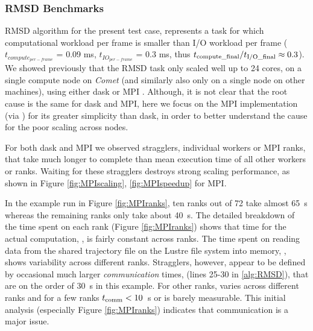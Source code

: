 \label{impl_exp}

\subsubsection{RMSD Benchmarks}
\label{sec:RMSD}
RMSD algorithm for the present test case, represents a task for which computational workload per frame is smaller than I/O workload per frame ($t_{compute_{per-frame}}$ = 0.09 ms, $t_{IO_{per-frame}}$ = 0.3 ms, thus ${t}_{\text{compute\_final}}/{t}_{\text{I/O\_final}} \approx 0.3$). 
We showed previously that the RMSD task only scaled well up to 24 cores, on a single compute node on \emph{Comet} (and similarly also only on a
single node on other machines), using either dask or MPI \citep{Khoshlessan:2017ab}. 
Although, it is not clear that the root cause is the same for dask and MPI, here we focus on the MPI
implementation (via  \citep{Dalcin:2011aa, Dalcin:2005aa}) for its greater simplicity than dask, in order to
better understand the cause for the poor scaling across nodes.

For both dask and MPI we observed stragglers, individual workers or
MPI ranks, that take much longer to complete than mean execution time of all other workers or ranks. 
Waiting for these stragglers destroys strong scaling performance, as shown in Figure \ref{fig:MPIscaling}, \ref{fig:MPIspeedup} for MPI. 

In the example run in Figure \ref{fig:MPIranks}, ten ranks out of 72 take almost 65~s whereas the
remaining ranks only take about 40~s. The detailed breakdown of the time spent on each rank (Figure \ref{fig:MPIranks}) shows that time
for the actual computation, \tcomp, is fairly constant across ranks. 
The time spent on reading data from the shared trajectory file on the Lustre file system into memory, \tIO, shows variability across different ranks. 
Stragglers, however, appear to be defined by occasional much larger \emph{communication} times, \tcomm (lines 25-30 in \ref{alg:RMSD}), that are on the order of 30~s in this example. 
For other ranks, \tcomm varies across different ranks and for a few ranks $t_{\text{comm}} < 10$~s or is barely measurable. 
This initial analysis (especially Figure \ref{fig:MPIranks}) indicates that communication is a major issue. 

